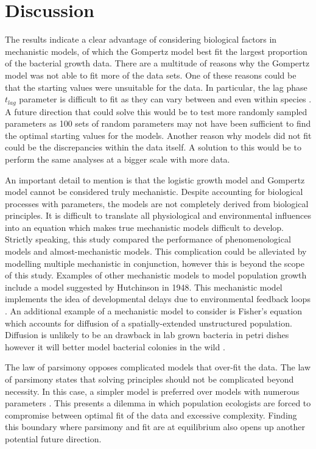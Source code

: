 \documentclass[11pt]{article}
\begin{document}
	
    \section{Discussion}
    The results indicate a clear advantage of considering biological factors in mechanistic models, of which the Gompertz model best fit the largest proportion of the bacterial growth data. There are a multitude of reasons why the Gompertz model was not able to fit more of the data sets. One of these reasons could be that the starting values were unsuitable for the data. In particular, the lag phase $t_{lag}$ parameter is difficult to fit as they can vary between and even within species \citep{zwietering1992comparison}. A future direction that could solve this would be to test more randomly sampled parameters as 100 sets of random parameters may not have been sufficient to find the optimal starting values for the models. Another reason why models did not fit could be the discrepancies within the data itself. A solution to this would be to perform the same analyses at a bigger scale with more data.
    
    An important detail to mention is that the logistic growth model and Gompertz model cannot be considered truly mechanistic. Despite accounting for biological processes with parameters, the models are not completely derived from biological principles. It is difficult to translate all physiological and environmental influences into an equation which makes true mechanistic models difficult to develop. Strictly speaking, this study compared the performance of phenomenological models and almost-mechanistic models. This complication could be alleviated by modelling multiple mechanistic in conjunction, however this is beyond the scope of this study. Examples of other mechanistic models to model population growth include a model suggested by Hutchinson in 1948. This mechanistic model implements the idea of developmental delays due to environmental feedback loops \citep{hutchinson1948circular}. An additional example of a mechanistic model to consider is Fisher's equation which accounts for diffusion of a spatially-extended unstructured population. Diffusion is unlikely to be an drawback in lab grown bacteria in petri dishes however it will better model bacterial colonies in the wild \citep{fisher1937wave}.
    
    The law of parsimony opposes complicated models that over-fit the data. The law of parsimony states that solving principles should not be complicated beyond necessity. In this case, a simpler model is preferred over models with numerous parameters \citep{re2002william}. This presents a dilemma in which population ecologists are forced to compromise between optimal fit of the data and excessive complexity. Finding this boundary where parsimony and fit are at equilibrium also opens up another potential future direction.
    
\end{document}
